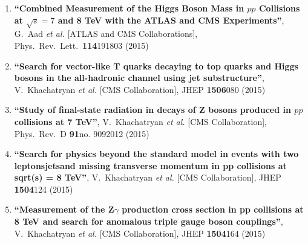 \begin{enumerate}

\item%
{\bf ``Combined Measurement of the Higgs Boson Mass in $pp$ Collisions at $\sqrt{s}=7$ and 8 TeV with the ATLAS and CMS Experiments''}, 
G.~Aad {\it et al.}  [ATLAS and CMS Collaborations], 
Phys.\ Rev.\ Lett.\  {\bf 114}191803 (2015) %


\item%
{\bf ``Search for vector-like T quarks decaying to top quarks and Higgs bosons in the all-hadronic channel using jet substructure''}, 
  V.~Khachatryan {\it et al.}  [CMS Collaboration], 
JHEP {\bf 1506}080 (2015) %


\item%
{\bf ``Study of final-state radiation in decays of Z bosons produced in $pp$ collisions at 7 TeV''}, 
  V.~Khachatryan {\it et al.}  [CMS Collaboration], 
Phys.\ Rev.\ D {\bf 91}no. 9092012 (2015) %



\item%
{\bf ``Search for physics beyond the standard model in events with two leptonsjetsand missing transverse momentum in pp collisions at sqrt(s) = 8 TeV''}, 
  V.~Khachatryan {\it et al.}  [CMS Collaboration], 
JHEP {\bf 1504}124 (2015) %


\item%
{\bf ``Measurement of the Z$\gamma$ production cross section in pp collisions at 8 TeV and search for anomalous triple gauge boson couplings''}, 
  V.~Khachatryan {\it et al.}  [CMS Collaboration], 
JHEP {\bf 1504}164 (2015) %



\end{enumerate}
